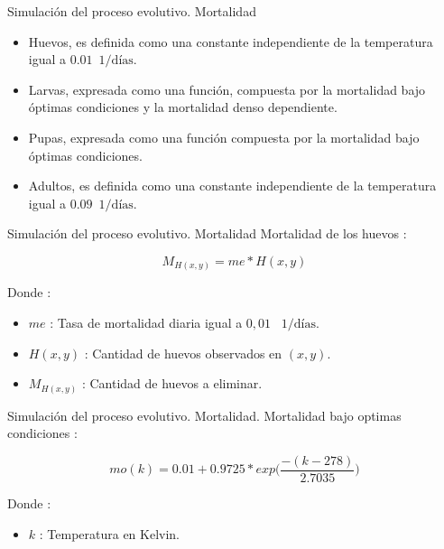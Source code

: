 \begin{frame}[c]{Simulación del proceso evolutivo. Mortalidad}
  \begin{itemize}
    \item Huevos, es definida como una constante independiente de la temperatura igual a $0.01$\ $1/\text{días}$.
    \item Larvas, expresada como una función, compuesta por la mortalidad bajo óptimas condiciones y la mortalidad denso dependiente.
    \item Pupas, expresada como una función compuesta por la mortalidad bajo óptimas condiciones.
    \item Adultos, es definida como una constante independiente de la temperatura igual a $0.09$\ $1/\text{días}$.
  \end{itemize}
\end{frame}

\begin{frame}[c]{Simulación del proceso evolutivo. Mortalidad}
  Mortalidad de los huevos :
  \begin{center}
      \begin{equation}
          M_{H(x,y)} = me * H(x,y)
      \end{equation}
  \end{center}
  Donde :
    \begin{itemize}
      \item $me$ : Tasa de mortalidad diaria igual a $0,01$ \ $1/\text{días}$.
      \item $H(x, y)$ : Cantidad de huevos observados en $(x,y)$.
      \item $M_{H(x,y)}$ : Cantidad de huevos a eliminar.
    \end{itemize}
\end{frame}

\begin{frame}[c]{Simulación del proceso evolutivo. Mortalidad.}
 Mortalidad bajo optimas condiciones :
\begin{center}
  \begin{equation}
  \label{eq:mortalidad-natural-larvas}
      mo(k) = 0.01 + 0.9725 * exp\bigg( \frac{-(k - 278)}{2.7035}\bigg)
  \end{equation}
\end{center}
Donde :
  \begin{itemize}
    \item $k$ : Temperatura en Kelvin.
  \end{itemize}
\end{frame}

